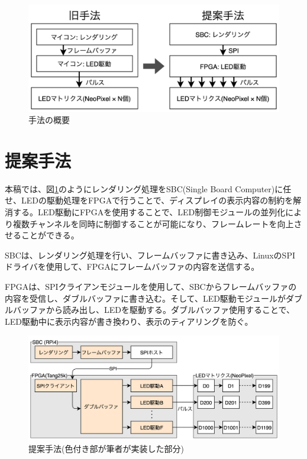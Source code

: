 \documentclass[a4paper,11pt, twocolumn]{ltjsarticle}
\begin{document}
\begin{figure}
\centering
\includegraphics[width=0.95\columnwidth]{syuhou.png}
\caption{手法の概要}
\label{fig:syuhou}
\end{figure}

\section{提案手法}
本稿では、図\ref{fig:syuhou}のようにレンダリング処理をSBC(Single Board Computer)に任せ、LEDの駆動処理をFPGAで行うことで、ディスプレイの表示内容の制約を解消する。LED駆動にFPGAを使用することで、LED制御モジュールの並列化により複数チャンネルを同時に制御することが可能になり、フレームレートを向上させることができる。

SBCは、レンダリング処理を行い、フレームバッファに書き込み、LinuxのSPIドライバを使用して、FPGAにフレームバッファの内容を送信する。

FPGAは、SPIクライアンモジュールを使用して、SBCからフレームバッファの内容を受信し、ダブルバッファに書き込む。そして、LED駆動モジュールがダブルバッファから読み出し、LEDを駆動する。ダブルバッファ使用することで、LED駆動中に表示内容が書き換わり、表示のティアリングを防ぐ。

\begin{figure}
\centering
\includegraphics[width=0.95\columnwidth]{syuhou2.png}
\caption{提案手法(色付き部が筆者が実装した部分)}
\label{fig:syuhou2}
\end{figure}
\end{document}
